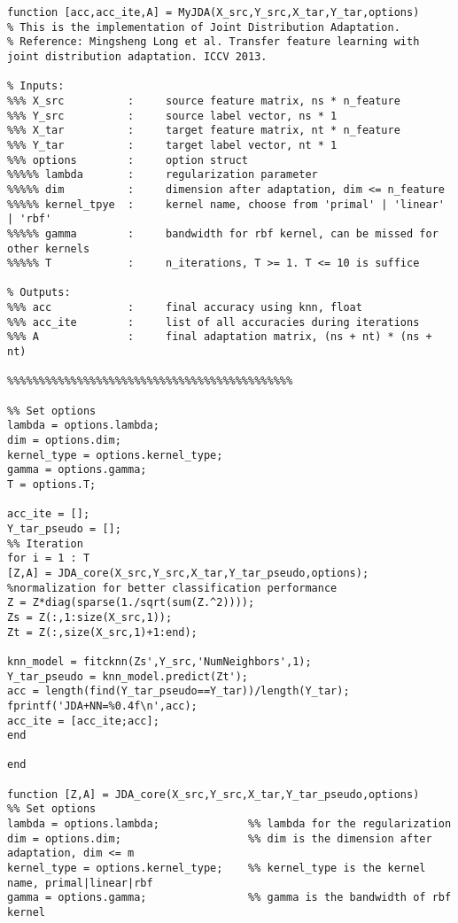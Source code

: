 \begin{lstlisting}[title=JDA方法的Matlab实现, frame=shadowbox]
function [acc,acc_ite,A] = MyJDA(X_src,Y_src,X_tar,Y_tar,options)
% This is the implementation of Joint Distribution Adaptation.
% Reference: Mingsheng Long et al. Transfer feature learning with joint distribution adaptation. ICCV 2013.

% Inputs:
%%% X_src          :     source feature matrix, ns * n_feature
%%% Y_src          :     source label vector, ns * 1
%%% X_tar          :     target feature matrix, nt * n_feature
%%% Y_tar          :     target label vector, nt * 1
%%% options        :     option struct
%%%%% lambda       :     regularization parameter
%%%%% dim          :     dimension after adaptation, dim <= n_feature
%%%%% kernel_tpye  :     kernel name, choose from 'primal' | 'linear' | 'rbf'
%%%%% gamma        :     bandwidth for rbf kernel, can be missed for other kernels
%%%%% T            :     n_iterations, T >= 1. T <= 10 is suffice

% Outputs:
%%% acc            :     final accuracy using knn, float
%%% acc_ite        :     list of all accuracies during iterations
%%% A              :     final adaptation matrix, (ns + nt) * (ns + nt)

%%%%%%%%%%%%%%%%%%%%%%%%%%%%%%%%%%%%%%%%%%%%%

%% Set options
lambda = options.lambda;              
dim = options.dim;                    
kernel_type = options.kernel_type;    
gamma = options.gamma;               
T = options.T;                        

acc_ite = [];
Y_tar_pseudo = [];
%% Iteration
for i = 1 : T
[Z,A] = JDA_core(X_src,Y_src,X_tar,Y_tar_pseudo,options);
%normalization for better classification performance
Z = Z*diag(sparse(1./sqrt(sum(Z.^2))));
Zs = Z(:,1:size(X_src,1));
Zt = Z(:,size(X_src,1)+1:end);

knn_model = fitcknn(Zs',Y_src,'NumNeighbors',1);
Y_tar_pseudo = knn_model.predict(Zt');
acc = length(find(Y_tar_pseudo==Y_tar))/length(Y_tar); 
fprintf('JDA+NN=%0.4f\n',acc);
acc_ite = [acc_ite;acc];
end

end

function [Z,A] = JDA_core(X_src,Y_src,X_tar,Y_tar_pseudo,options)
%% Set options
lambda = options.lambda;              %% lambda for the regularization
dim = options.dim;                    %% dim is the dimension after adaptation, dim <= m
kernel_type = options.kernel_type;    %% kernel_type is the kernel name, primal|linear|rbf
gamma = options.gamma;                %% gamma is the bandwidth of rbf kernel


\end{lstlisting}

